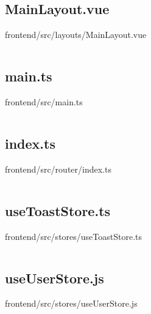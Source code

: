 \inputminted[linenos,breaklines,tabsize=2]{typescript}{/Users/Henry/Desktop/NEAComputerScience/frontend/src/composables/useSimulationHub.ts}

\makeatletter
\subsection*{MainLayout.vue}
frontend/src/layouts/MainLayout.vue
\def\@currentlabelname{MainLayout.vue}
\label{code:frontend:src:layouts:MainLayout.vue}
\makeatother

\inputminted[linenos,breaklines,tabsize=2]{vue}{/Users/Henry/Desktop/NEAComputerScience/frontend/src/layouts/MainLayout.vue}

\makeatletter
\subsection*{main.ts}
frontend/src/main.ts
\def\@currentlabelname{main.ts}
\label{code:frontend:src:main.ts}
\makeatother

\inputminted[linenos,breaklines,tabsize=2]{typescript}{/Users/Henry/Desktop/NEAComputerScience/frontend/src/main.ts}

\makeatletter
\subsection*{index.ts}
frontend/src/router/index.ts
\def\@currentlabelname{index.ts}
\label{code:frontend:src:router:index.ts}
\makeatother

\inputminted[linenos,breaklines,tabsize=2]{typescript}{/Users/Henry/Desktop/NEAComputerScience/frontend/src/router/index.ts}

\makeatletter
\subsection*{useToastStore.ts}
frontend/src/stores/useToastStore.ts
\def\@currentlabelname{useToastStore.ts}
\label{code:frontend:src:stores:useToastStore.ts}
\makeatother

\inputminted[linenos,breaklines,tabsize=2]{typescript}{/Users/Henry/Desktop/NEAComputerScience/frontend/src/stores/useToastStore.ts}

\makeatletter
\subsection*{useUserStore.js}
frontend/src/stores/useUserStore.js
\def\@currentlabelname{useUserStore.js}
\label{code:frontend:src:stores:useUserStore.js}
\makeatother

